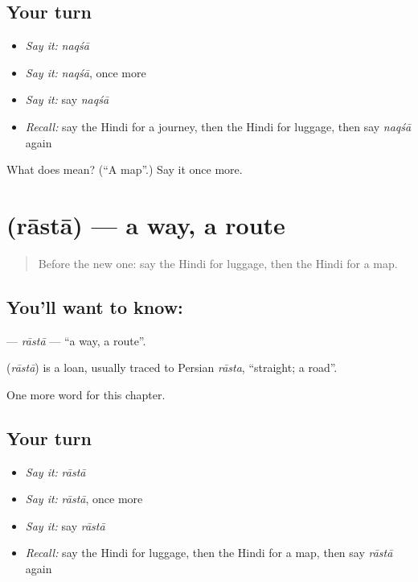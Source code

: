 \subsection*{Your turn}
\begin{itemize}
\raggedright
  \item \emph{Say it:} \emph{naqśā}
  \item \emph{Say it:} \emph{naqśā}, once more
  \item \emph{Say it:} say \emph{naqśā}
  \item \emph{Recall:} say the Hindi for a journey, then the Hindi for luggage, then say \emph{naqśā} again
\end{itemize}

\begin{tcolorbox}[breakable,colback=teal!4,colframe=teal!35!black,title={Before you move on}]
What does  mean? (\textquotedblleft{}A map\textquotedblright{}.) Say it once more.
\end{tcolorbox}
\section[\texorpdfstring{\hi{रास्ता} (rāstā)}{रास्ता (rāstā)}]{ (rāstā) — a way, a route}

\label{lesson:HI-C181-rasta}



\begin{quote}
Before the new one: say the Hindi for luggage, then the Hindi for a map.
\end{quote}

\subsection*{You'll want to know: }
\textbf{} — \emph{rāstā} — \textquotedblleft{}a way, a route\textquotedblright{}.

\begin{cousinweb}
\textbf{} (\emph{rāstā}) is a loan, usually traced to Persian \emph{rāsta}, \textquotedblleft{}straight; a road\textquotedblright{}.
\end{cousinweb}

\begin{grammarlens}[title={What you've built}]
One more word for this chapter.
\end{grammarlens}

\subsection*{Your turn}
\begin{itemize}
\raggedright
  \item \emph{Say it:} \emph{rāstā}
  \item \emph{Say it:} \emph{rāstā}, once more
  \item \emph{Say it:} say \emph{rāstā}
  \item \emph{Recall:} say the Hindi for luggage, then the Hindi for a map, then say \emph{rāstā} again
\end{itemize}


